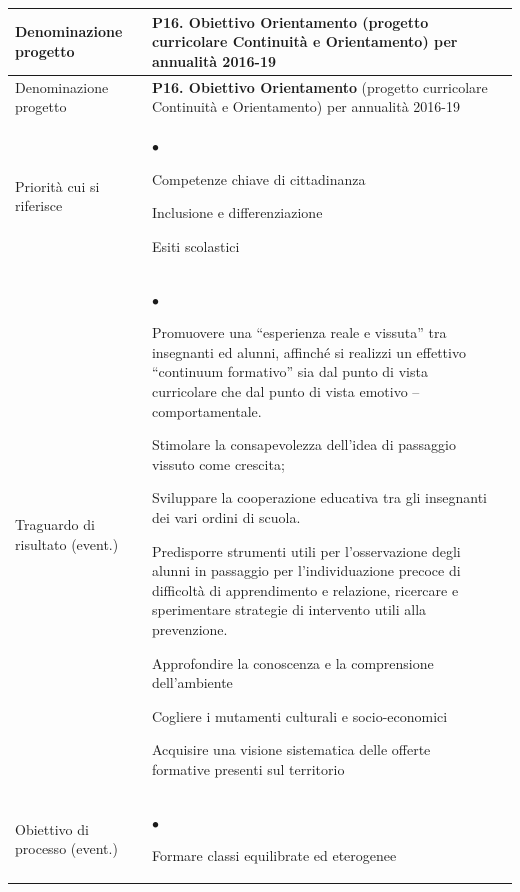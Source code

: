 \documentclass[12pt,a4paper,oneside]{memoir}
\newenvironment{elenco}{\begin{list}{$\bullet$}{%
              \setlength{\leftmargin}{4mm}%
              \setlength{\rightmargin}{1mm}%
               \setlength{\itemindent}{0mm}%
               \setlength{\labelwidth}{2mm}%
               \setlength{\labelsep}{2mm}%
              \setlength{\itemsep}{-\parsep}%
              \setlength{\partopsep}{0pt}%
              \setlength{\topsep}{0pt}%
             \setlength{\parskip}{0pt}%
              }}{\end{list}}
\begin{document}
\begin{footnotesize}
\begin{longtable}{|>{\raggedright}p{2.5cm}|>{\raggedright\arraybackslash}P{10cm}|}
\hline
{}
\label{P16}Denominazione progetto&\textbf{P16. Obiettivo Orientamento} (progetto curricolare Continuità e Orientamento) per annualità 2016-19 \\ \hline \endfirsthead
\hline
{}
Denominazione progetto&\textbf{P16. Obiettivo Orientamento} (progetto curricolare Continuità e Orientamento) per annualità 2016-19 \\ \hline \endhead
{}
\endfoot
\hline
\endlastfoot
Priorità cui si riferisce&
\begin{elenco}
\item Competenze chiave di cittadinanza 
\item Inclusione e differenziazione
\item Esiti scolastici
\end{elenco}\\[-4mm] \hline
Traguardo di risultato (event.)&
\begin{elenco}
\item Promuovere una ``esperienza reale e vissuta'' tra insegnanti ed alunni, affinché si realizzi un effettivo ``continuum formativo'' sia dal punto di vista curricolare che dal punto di vista emotivo – comportamentale.
\item Stimolare la consapevolezza dell'idea di passaggio vissuto come crescita; 
\item Sviluppare la cooperazione educativa tra gli insegnanti dei vari ordini di scuola.
\item Predisporre strumenti utili per l'osservazione degli alunni in passaggio per l'individuazione precoce di difficoltà di apprendimento e relazione, ricercare e sperimentare strategie di intervento utili alla prevenzione.
\item Approfondire la conoscenza e la comprensione dell'ambiente 
\item Cogliere i mutamenti culturali e socio-economici 
\item Acquisire una visione sistematica delle offerte formative presenti sul territorio
\end{elenco} \\[-4mm] \hline
Obiettivo di processo (event.)&
\begin{elenco}
\item Formare classi equilibrate ed eterogenee

\end{elenco}
\end{longtable}
\end{footnotesize}
\end{document}
